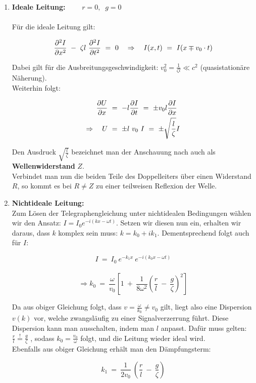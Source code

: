 \begin{enumerate}
\item \textbf{ Ideale Leitung:} $\qquad r=0, \; \; g=0$
\ \\
\ \\
Für die ideale Leitung gilt:

\begin{equation*}
\pddiff{I}{x} \ - \ \zeta l \ \pddiff{I}{t} \ = \  	0 \quad \Rightarrow\quad I(x,t)  \ = \ I(x \mp v_0\cdot t)
\end{equation*}

Dabei gilt für die Ausbreitungsgeschwindigkeit: $v_0^2 = \frac{1}{\zeta l} \ll c^2$ (quasistationäre Näherung).\\
Weiterhin folgt:

\begin{align*}
\frac{\partial{U}}{\partial{x}} \ &= \ - l\frac{\partial{I}}{\partial{t}} \ = \ \pm v_0 l \frac{\partial{I}}{\partial{x}}\\
\Rightarrow \quad U \ &= \ \pm l \ v_0 \ I  \ = \ \pm \sqrt{\frac{l}{\zeta}}I 
\end{align*}

Den Ausdruck $\sqrt{\frac{l}{\zeta}}$ bezeichnet man der Anschauung nach auch als \textbf{Wellenwiderstand} $Z$.\\
Verbindet man nun die beiden Teile des Doppelleiters über einen Widerstand $R$, so kommt es bei $R\neq Z$ zu einer teilweisen Reflexion der Welle.\\

\item \textbf{ Nichtideale Leitung:}
\ \\

Zum Lösen der Telegraphengleichung unter nichtidealen Bedingungen wählen wir den Ansatz: $I=I_0 e^{-i(kx-\omega t)}$. Setzen wir diesen nun ein, erhalten wir daraus, dass $k$ komplex sein muss: $k=k_0 + ik_1$. Dementsprechend folgt auch für $I$:

\begin{equation*}
I  \ = \ I_0 \ e^{-k_1 x} \ e^{-i(k_0 x -\omega t)}
\end{equation*}
\ \\
\begin{equation*}
\Rightarrow k_0  \ = \ \frac{\omega}{v_0}\left[1 \ + \ \frac{1}{8\omega^2}\left(\frac{r}{l} \ - \ \frac{g}{\zeta}\right)^2\right]
\end{equation*}

Da aus obiger Gleichung folgt, dass $v= \frac{\omega}{k_0}\neq v_0$ gilt, liegt also eine Dispersion $v(k)$ vor, welche zwangsläufig zu einer Signalverzerrung führt. Diese Dispersion kann man \grqq ausschalten\grqq , indem man  $l$ anpasst. Dafür muss gelten: $\frac{r}{l} \overset{!}{=}   \frac{g}{\zeta}$ , sodass $k_0 =\frac{v_0}{\omega}$ folgt, und die Leitung wieder ideal wird.\\
Ebenfalls aus obiger Gleichung erhält man den Dämpfungsterm:

\begin{equation*}
k_1  \ = \ \frac{1}{2v_0} \ \left(\frac{r}{l} \ - \ \frac{g}{\zeta}\right)
\end{equation*}
\end{enumerate}


